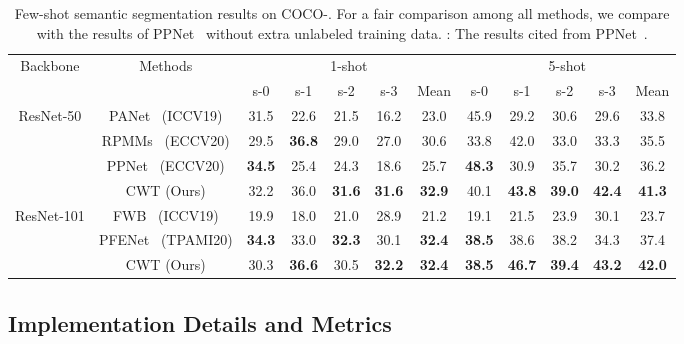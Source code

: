 \documentclass[10pt,twocolumn,letterpaper]{article}
\begin{document}
\begin{table*}[h]
    \centering
    \begin{tabular}{c|c|ccccc|ccccc}
    \hline
    \hline
         \multirow{2}{*}{Backbone} & \multirow{2}{*}{Methods} & \multicolumn{5}{c}{1-shot} & \multicolumn{5}{c}{5-shot}  \\
         \cline{3-12}
          & & s-0 & s-1 & s-2 & s-3 & Mean & s-0 & s-1 & s-2 & s-3 & Mean \\
\hline
         \multirow{4}{*}{ResNet-50} & PANet~\cite{wang2019panet} (ICCV19) & 31.5 & 22.6 & 21.5 & 16.2 & 23.0 & 45.9 & 29.2 & 30.6 & 29.6 & 33.8 \\
         & RPMMs~\cite{yang2020prototype} (ECCV20) & 29.5 & \textbf{36.8} & 29.0 & 27.0 & 30.6 & 33.8 & 42.0 & 33.0 & 33.3 & 35.5 \\
         & PPNet~\cite{liu2020part} (ECCV20)& \textbf{34.5} & 25.4 & 24.3 & 18.6 & 25.7 & \textbf{48.3} & 30.9 & 35.7 & 30.2 & 36.2 \\
         & CWT (Ours) & 32.2 & 36.0 & \textbf{31.6} & \textbf{31.6} & \textbf{32.9} & 40.1 & \textbf{43.8} & \textbf{39.0} & \textbf{42.4} & \textbf{41.3}  \\
         \hline
         \multirow{3}{*}{ResNet-101} & FWB~\cite{nguyen2019feature} (ICCV19) & 19.9 & 18.0 & 21.0 & 28.9 & 21.2 & 19.1 & 21.5 & 23.9 & 30.1 & 23.7 \\
         & PFENet~\cite{tian2020prior} (TPAMI20) & \textbf{34.3} & 33.0 & \textbf{32.3} & 30.1 & \textbf{32.4} & \textbf{38.5} & 38.6 & 38.2 & 34.3 & 37.4 \\
         & CWT (Ours) & 30.3 & \textbf{36.6} & 30.5 & \textbf{32.2} & \textbf{32.4} & \textbf{38.5} & \textbf{46.7} & \textbf{39.4} & \textbf{43.2} & \textbf{42.0}  \\
         \hline
         \hline
    \end{tabular}
    \vspace{2pt}
    \caption{Few-shot semantic segmentation results on COCO-. 
    For a fair comparison among all methods,
    we compare with the results of PPNet~\cite{liu2020part}
    without extra unlabeled training data. : The results cited from PPNet~\cite{liu2020part}. 
}
    \label{tab:main_coco}
\end{table*}

\subsection{Implementation Details and Metrics}
\end{document}
